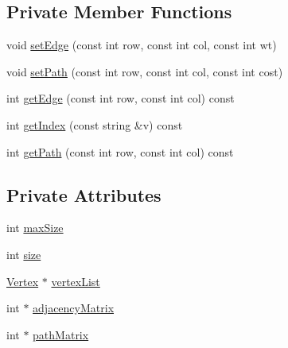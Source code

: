 \subsection*{\-Private \-Member \-Functions}
\begin{DoxyCompactItemize}
\item 
void \hyperlink{class_weighted_graph_a9a7095848029a217a2360ca8f6fc6fc7}{set\-Edge} (const int row, const int col, const int wt)
\item 
void \hyperlink{class_weighted_graph_a68788bc02a44a33289411a0d3d1da85a}{set\-Path} (const int row, const int col, const int cost)
\item 
int \hyperlink{class_weighted_graph_a8079a4fb184edefad85863d915e66e9e}{get\-Edge} (const int row, const int col) const 
\item 
int \hyperlink{class_weighted_graph_a0c6d1c040128d1818ab3b38ff72723a4}{get\-Index} (const string \&v) const 
\item 
int \hyperlink{class_weighted_graph_a8360fa50be8d2bc095b2ba69d02eb319}{get\-Path} (const int row, const int col) const 
\end{DoxyCompactItemize}
\subsection*{\-Private \-Attributes}
\begin{DoxyCompactItemize}
\item 
int \hyperlink{class_weighted_graph_ae8cd4e7b91702a470e59472979e94cb5}{max\-Size}
\item 
int \hyperlink{class_weighted_graph_a4452835ad9619580ff968a4d6a9cfe44}{size}
\item 
\hyperlink{class_weighted_graph_1_1_vertex}{\-Vertex} $\ast$ \hyperlink{class_weighted_graph_a0893fce457ff57820d30fd050777a058}{vertex\-List}
\item 
int $\ast$ \hyperlink{class_weighted_graph_aed50ef32c1c87bb10ca5d1bbc182880a}{adjacency\-Matrix}
\item 
int $\ast$ \hyperlink{class_weighted_graph_ad2e0c787899af85ebf86e9c68431c9aa}{path\-Matrix}
\end{DoxyCompactItemize}


